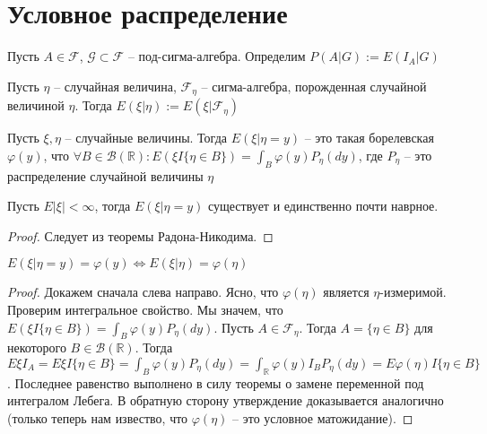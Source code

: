 \documentclass[document.tex]{subfiles}
\begin{document}
\section{Условное распределение}
\begin{definition}
    Пусть $A \in \mathcal{F}$, $\mathcal{G} \subset \mathcal{F}$ -- под-сигма-алгебра. Определим $P(A|G) := E(I_A|G)$
\end{definition}

\begin{definition}
    Пусть $\eta$ -- случайная величина, $\mathcal{F}_{\eta}$ -- сигма-алгебра, порожденная случайной величиной $\eta$.
    Тогда $E(\xi|\eta) := E(\xi|\mathcal{F}_{\eta})$
\end{definition}

\begin{definition}
    Пусть $\xi, \eta$ -- случайные величины. Тогда $E(\xi | \eta = y)$ -- это такая борелевская $\varphi(y)$, что 
    $\forall B \in \mathcal{B}(\mathbb{R}): E(\xi I \{\eta \in B\}) = \int_B \varphi(y) P_{\eta}(dy)$, где $P_{\eta}$ --
    это распределение случайной величины $\eta$
\end{definition}

\begin{lemma}
    Пусть $E|\xi| < \infty$, тогда $E(\xi|\eta = y)$ существует и единственно почти наврное.
\end{lemma}

\begin{proof}
    Следует из теоремы Радона-Никодима.
\end{proof}

\begin{statement}
    $E(\xi | \eta = y) = \varphi(y) \Leftrightarrow E(\xi | \eta) = \varphi(\eta)$
\end{statement}

\begin{proof}
    Докажем сначала слева направо. Ясно, что $\varphi(\eta)$ является $\eta$-измеримой. Проверим интегральное свойство.
    Мы значем, что $E(\xi I\{\eta\in B\}) = \int_B \varphi(y) P_{\eta}(dy)$. Пусть $A \in \mathcal{F}_{\eta}$. Тогда $A
    = \{\eta \in B\}$ для некоторого $B \in \mathcal{B}(\mathbb{R})$. Тогда $E\xi I_A = E\xi I\{\eta \in B\} = \int_B
    \varphi(y) P_{\eta}(dy) = \int_{\mathbb{R}} \varphi(y) I_{B} P_{\eta}(dy) = E \varphi(\eta) I\{\eta \in B\}$.
    Последнее равенство выполнено в силу теоремы о замене переменной под интегралом Лебега.
    В обратную сторону утверждение доказывается аналогично (только теперь нам извество, что $\varphi(\eta)$ -- это
    условное матожидание).
\end{proof}
\end{document}
